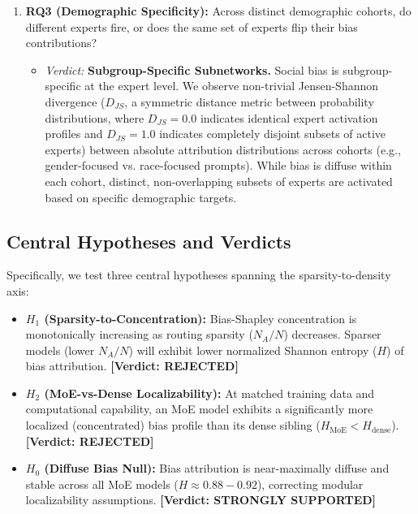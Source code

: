 \documentclass[11pt,a4paper]{article}
\begin{document}
\begin{enumerate}
    \item \textbf{RQ3 (Demographic Specificity):} Across distinct demographic cohorts, do different experts fire, or does the same set of experts flip their bias contributions?
    \begin{itemize}
        \item \textit{Verdict:} \textbf{Subgroup-Specific Subnetworks.} Social bias is subgroup-specific at the expert level. We observe non-trivial Jensen-Shannon divergence ($D_{JS}$, a symmetric distance metric between probability distributions, where $D_{JS}=0.0$ indicates identical expert activation profiles and $D_{JS}=1.0$ indicates completely disjoint subsets of active experts) between absolute attribution distributions across cohorts (e.g., gender-focused vs. race-focused prompts). While bias is diffuse within each cohort, distinct, non-overlapping subsets of experts are activated based on specific demographic targets.
    \end{itemize}
\end{enumerate}

\subsection{Central Hypotheses and Verdicts}
Specifically, we test three central hypotheses spanning the sparsity-to-density axis:
\begin{itemize}
    \item \textbf{$H_1$ (Sparsity-to-Concentration):} Bias-Shapley concentration is monotonically increasing as routing sparsity ($N_A/N$) decreases. Sparser models (lower $N_A/N$) will exhibit lower normalized Shannon entropy ($H$) of bias attribution. \textbf{[Verdict: REJECTED]}
    \item \textbf{$H_2$ (MoE-vs-Dense Localizability):} At matched training data and computational capability, an MoE model exhibits a significantly more localized (concentrated) bias profile than its dense sibling ($H_{\text{MoE}} < H_{\text{dense}}$). \textbf{[Verdict: REJECTED]}
    \item \textbf{$H_0$ (Diffuse Bias Null):} Bias attribution is near-maximally diffuse and stable across all MoE models ($H \approx 0.88 - 0.92$), correcting modular localizability assumptions. \textbf{[Verdict: STRONGLY SUPPORTED]}
\end{itemize}
\end{document}
